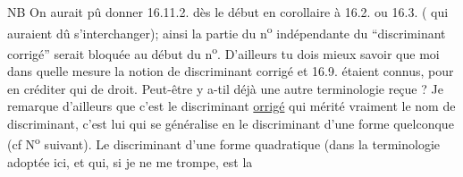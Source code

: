 NB On aurait pû donner 16.11.2. dès le début en corollaire à
16.2. ou 16.3. ( qui auraient dû s'interchanger); ainsi la partie du n\textsuperscript{o}
indépendante du ``discriminant corrigé'' serait bloquée au début du n\textsuperscript{o}.
D'ailleurs tu dois mieux savoir que moi dans quelle mesure la notion
de discriminant corrigé et 16.9. étaient connus, pour en créditer qui de
droit. Peut-être y a-t\hand{\unsure{-}}il déjà une autre terminologie reçue ? Je remarque
d'ailleurs que c'est le discriminant \uline{orrigé} qui mérité vraiment le nom
de discriminant, c'est lui qui se généralise en le discriminant d'une
forme quelconque (cf N\textsuperscript{o} suivant). Le discriminant d'une forme quadratique
(dans la terminologie adoptée ici, et qui, si je ne me trompe, est la

